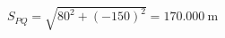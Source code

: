 \documentclass[border=3pt]{standalone}
\begin{document}
\color{ink}\fontsize{25}{32}\selectfont
$\displaystyle S_{PQ}=\sqrt{80^2+(-150)^2}=170.000\ \mathrm{m}$
\end{document}

